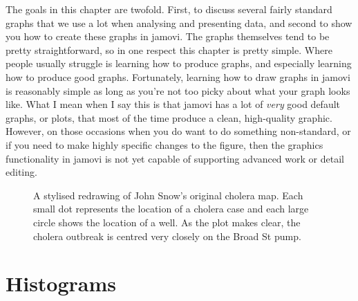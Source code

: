 The goals in this chapter are twofold. First, to discuss several fairly standard graphs that we use a lot when analysing and presenting data, and second to show you how to create these graphs in jamovi. The graphs themselves tend to be pretty straightforward, so in one respect this chapter is pretty simple. Where people usually struggle is learning how to produce graphs, and especially learning how to produce good graphs. Fortunately, learning how to draw graphs in jamovi is reasonably simple as long as you're not too picky about what your graph looks like. What I mean when I say this is that jamovi has a lot of {\it very} good default graphs, or plots, that most of the time produce a clean, high-quality graphic. However, on those occasions when you do want to do something non-standard, or if you need to make highly specific changes to the figure, then the graphics functionality in jamovi is not yet capable of supporting advanced work or detail editing. 

\begin{figure}[htb]
\begin{center}
\caption{A stylised redrawing of John Snow's original cholera map. Each small dot represents the location of a cholera case and each large circle shows the location of a well. As the plot makes clear, the cholera outbreak is centred very closely on the Broad St pump.}
\label{fig:snowmap1}
\HR
\end{center}
\end{figure}


\section{Histograms\label{sec:hist}}
 
